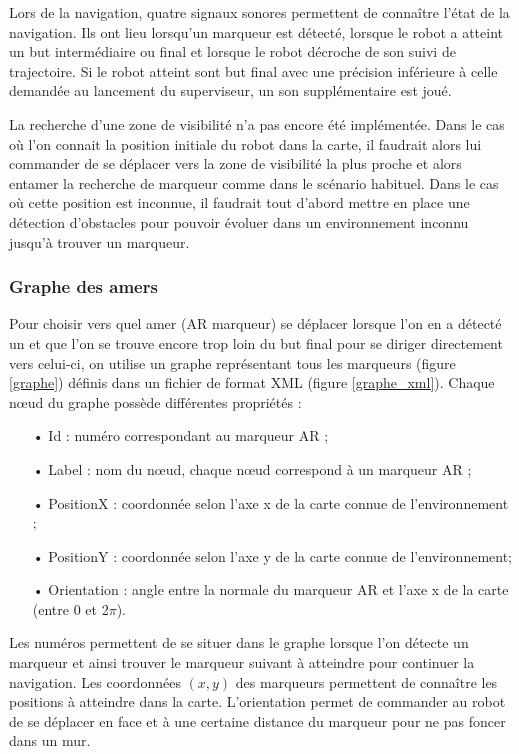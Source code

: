 \documentclass[10pt,a4paper]{article}
\begin{document}
Lors de la navigation, quatre signaux sonores permettent de connaître l'état de la navigation. Ils ont lieu lorsqu'un marqueur est détecté, lorsque le robot a atteint un but intermédiaire ou final et lorsque le robot décroche de son suivi de trajectoire. Si le robot atteint sont but final avec une précision inférieure à celle demandée au lancement du superviseur, un son supplémentaire est joué.

La recherche d'une zone de visibilité n'a pas encore été implémentée. Dans le cas où l'on connait la position initiale du robot dans la carte, il faudrait alors lui commander de se déplacer vers la zone de visibilité la plus proche et alors entamer la recherche de marqueur comme dans le scénario habituel. Dans le cas où cette position est inconnue, il faudrait tout d'abord mettre en place une détection d'obstacles pour pouvoir évoluer dans un environnement inconnu jusqu'à trouver un marqueur.

\subsubsection{Graphe des amers}
\label{sec:grapheDesAmers}

Pour choisir vers quel amer (AR marqueur) se déplacer lorsque l'on en a détecté un et que l'on se trouve encore trop loin du but final pour se diriger directement vers celui-ci, on utilise un graphe représentant tous les marqueurs (figure \ref{graphe}) définis dans un fichier de format XML (figure \ref{graphe_xml}). Chaque nœud du graphe possède différentes propriétés : 
\begin{itemize}
\item[•] Id : numéro correspondant au marqueur AR ; 
\item[•] Label : nom du nœud, chaque nœud correspond à un marqueur AR ; 
\item[•] PositionX : coordonnée selon l'axe x de la carte connue de l'environnement ; 
\item[•] PositionY : coordonnée selon l'axe y de la carte connue de l'environnement; 
\item[•] Orientation : angle entre la normale du marqueur AR et l'axe x de la carte (entre 0 et 2$\pi$).
\end{itemize}
Les numéros permettent de se situer dans le graphe lorsque l'on détecte un marqueur et ainsi trouver le marqueur suivant à atteindre pour continuer la navigation. Les coordonnées $(x,y)$ des marqueurs permettent de connaître les positions à atteindre dans la carte. L'orientation permet de commander au robot de se déplacer en face et à une certaine distance du marqueur pour ne pas foncer dans un mur.
\end{document}
